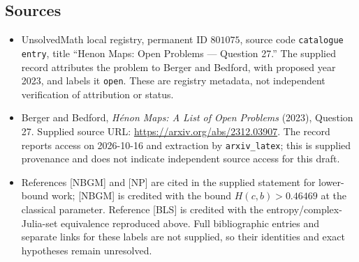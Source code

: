 \documentclass[11pt]{article}
\begin{document}
\subsection{Sources}
\begin{itemize}
\item UnsolvedMath local registry, permanent ID \(801075\), source code \texttt{catalogue entry}, title ``Henon Maps: Open Problems --- Question 27.'' The supplied record attributes the problem to Berger and Bedford, with proposed year 2023, and labels it \texttt{open}. These are registry metadata, not independent verification of attribution or status.
\item Berger and Bedford, \emph{H\'enon Maps: A List of Open Problems} (2023), Question 27. Supplied source URL: \url{https://arxiv.org/abs/2312.03907}. The record reports access on 2026-10-16 and extraction by \texttt{arxiv\_latex}; this is supplied provenance and does not indicate independent source access for this draft.
\item References [NBGM] and [NP] are cited in the supplied statement for lower-bound work; [NBGM] is credited with the bound \(H(c,b)>0.46469\) at the classical parameter. Reference [BLS] is credited with the entropy/complex-Julia-set equivalence reproduced above. Full bibliographic entries and separate links for these labels are not supplied, so their identities and exact hypotheses remain unresolved.
\end{itemize}
\end{document}
